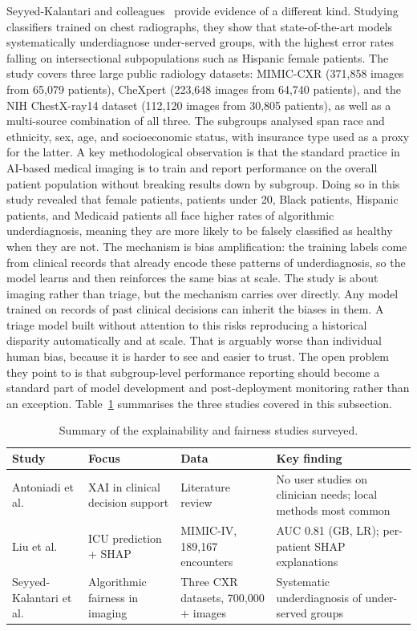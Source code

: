 \documentclass[11pt]{article}
\begin{document}
Seyyed-Kalantari and colleagues~\cite{SeyyedKalantari2021} provide evidence of a different kind. Studying classifiers trained on chest radiographs, they show that state-of-the-art models systematically underdiagnose under-served groups, with the highest error rates falling on intersectional subpopulations such as Hispanic female patients. The study covers three large public radiology datasets: MIMIC-CXR (371,858 images from 65,079 patients), CheXpert (223,648 images from 64,740 patients), and the NIH ChestX-ray14 dataset (112,120 images from 30,805 patients), as well as a multi-source combination of all three. The subgroups analysed span race and ethnicity, sex, age, and socioeconomic status, with insurance type used as a proxy for the latter. A key methodological observation is that the standard practice in AI-based medical imaging is to train and report performance on the overall patient population without breaking results down by subgroup. Doing so in this study revealed that female patients, patients under 20, Black patients, Hispanic patients, and Medicaid patients all face higher rates of algorithmic underdiagnosis, meaning they are more likely to be falsely classified as healthy when they are not. The mechanism is bias amplification: the training labels come from clinical records that already encode these patterns of underdiagnosis, so the model learns and then reinforces the same bias at scale. The study is about imaging rather than triage, but the mechanism carries over directly. Any model trained on records of past clinical decisions can inherit the biases in them. A triage model built without attention to this risks reproducing a historical disparity automatically and at scale. That is arguably worse than individual human bias, because it is harder to see and easier to trust. The open problem they point to is that subgroup-level performance reporting should become a standard part of model development and post-deployment monitoring rather than an exception. Table~\ref{tab:xai_fairness} summarises the three studies covered in this subsection.

\begin{table}[H]
\centering
\caption{Summary of the explainability and fairness studies surveyed.}
\label{tab:xai_fairness}
\begin{tabular}{p{3.5cm} p{2.5cm} p{3cm} p{3cm}}
\toprule
\textbf{Study} & \textbf{Focus} & \textbf{Data} & \textbf{Key finding} \\
\midrule
Antoniadi et al.~\cite{Antoniadi} & XAI in clinical decision support & Literature review & No user studies on clinician needs; local methods most common \\
Liu et al.~\cite{Liu2025} & ICU prediction + SHAP & MIMIC-IV, 189{,}167 encounters & AUC 0.81 (GB, LR); per-patient SHAP explanations \\
Seyyed-Kalantari et al.~\cite{SeyyedKalantari2021} & Algorithmic fairness in imaging & Three CXR datasets, 700{,}000$+$ images & Systematic underdiagnosis of under-served groups \\
\bottomrule
\end{tabular}
\end{table}
\end{document}
